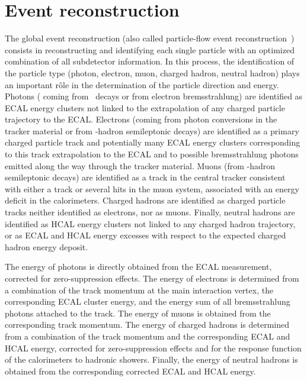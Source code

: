\section{Event reconstruction}
\label{sec:event_reconstruction}

The global event reconstruction (also called particle-flow event
reconstruction~\cite{CMS-PAS-PFT-09-001,CMS-PAS-PFT-10-001}) consists
in reconstructing and identifying each single particle with an
optimized combination of all subdetector information. In this process,
the identification of the particle type (photon, electron, muon,
charged hadron, neutral hadron) plays an important r\^ole in the
determination of the particle direction and energy. Photons (\eg
coming from \Pgpz\ decays or from electron bremsstrahlung) are
identified as ECAL energy clusters not linked to the extrapolation of
any charged particle trajectory to the ECAL. Electrons (\eg coming
from photon conversions in the tracker material or from \cPqb-hadron
semileptonic decays) are identified as a primary charged particle
track and potentially many ECAL energy clusters corresponding to this
track extrapolation to the ECAL and to possible bremsstrahlung photons
emitted along the way through the tracker material. Muons (\eg from
\cPqb-hadron semileptonic decays) are identified as a track in the
central tracker consistent with either a track or several hits in the
muon system, associated with an energy deficit in the
calorimeters. Charged hadrons are identified as charged particle
tracks neither identified as electrons, nor as muons. Finally, neutral
hadrons are identified as HCAL energy clusters not linked to any
charged hadron trajectory, or as ECAL and HCAL energy excesses with
respect to the expected charged hadron energy deposit.

The energy of photons is directly obtained from the ECAL measurement,
corrected for zero-suppression effects. The energy of electrons is
determined from a combination of the track momentum at the main
interaction vertex, the corresponding ECAL cluster energy, and the
energy sum of all bremsstrahlung photons attached to the track. The
energy of muons is obtained from the corresponding track momentum. The
energy of charged hadrons is determined from a combination of the
track momentum and the corresponding ECAL and HCAL energy, corrected
for zero-suppression effects and for the response function of the
calorimeters to hadronic showers. Finally, the energy of neutral
hadrons is obtained from the corresponding corrected ECAL and HCAL
energy.

